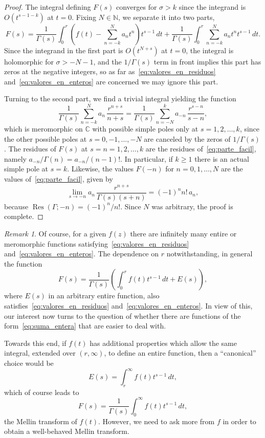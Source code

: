 \documentclass[11pt,a4paper]{amsart}
\newcommand{\N}{\mathbb{N}}
\newcommand{\C}{\mathbb{C}}
\newcommand{\Res}{\operatorname{Res}}
\theoremstyle{plain}
\theoremstyle{plain}
\theoremstyle{plain}
\theoremstyle{definition}
\theoremstyle{remark}
\newtheorem*{remark}{Remark}
\begin{document}
\begin{proof} 
The integral defining $F(s)$ converges for $\sigma > k$ since the integrand is  $O(t^{s-1-k})$ at $t=0$. Fixing $N \in \N$, we separate it into two parts,
\begin{equation*}
  F(s) = \frac{1}{\Gamma(s)} \int_{0}^r \left(f(t)-\sum_{n=-k}^N a_{n} t^{n}\right)t^{s-1}\,dt
 + \frac{1}{\Gamma(s)}\int_{0}^r \sum_{n=-k}^N a_{n} t^{n} t^{s-1}\,dt.
\end{equation*}
Since the integrand in the first part is $O(t^{N+s})$ at $t = 0$, the integral is holomorphic for $\sigma>-N-1$, and the $1/\Gamma(s)$ term in front implies this part has zeros at the negative integers, so as far as~\eqref{eq:valores_en_residuos} and~\eqref{eq:valores_en_enteros} are concerned we may ignore this part.

Turning to the second part, we find a trivial integral yielding the function
\begin{equation}
\label{eq:parte_facil}
  \frac{1}{\Gamma(s)}\sum_{n=-k}^{N} a_{n}\, \frac{r^{n+s}}{n+s}
  = \frac{1}{\Gamma(s)}\sum_{n=-N}^{k} a_{-n}\, \frac{r^{s-n}}{s-n},
\end{equation}
which is meromorphic on $\C$ with possible simple poles only at $s=1,2,\dots,k$, since the other possible poles at $s=0,-1,\dots,-N$ are canceled by the zeros of $1/\Gamma(s)$. The residues of $F(s)$ at $s = n = 1,2,\dots,k$ are the residues of~\eqref{eq:parte_facil}, namely $a_{-n}/\Gamma(n) = a_{-n}/(n-1)!$. In particular, if $k \geq 1$ there is an actual simple pole at $s=k$. Likewise, the values $F(-n)$ for $n=0,1,\dots,N$ are the values of~\eqref{eq:parte_facil}, given by
\[
  \lim_{s\to -n} a_{n} \, \frac{r^{n+s}}{\Gamma(s)(s+n)}=(-1)^{n} n!\,a_{n},
\]
because $\Res(\Gamma;-n) = (-1)^{n}/n!$. Since $N$ was arbitrary, the proof is complete.
\end{proof}


\begin{remark} 
Of course, for a given $f(z)$ there are infinitely many entire or meromorphic functions satisfying~\eqref{eq:valores_en_residuos} and~\eqref{eq:valores_en_enteros}. The dependence on $r$ notwithstanding, in general the function
\begin{equation}
\label{eq:suma_entera}
  F(s) = \frac{1}{\Gamma(s)} \left(\int_{0}^r f(t) t^{s-1}\,dt + E(s)\right),
\end{equation}
where $E(s)$ in an arbitrary entire function, also satisfies~\eqref{eq:valores_en_residuos} and~\eqref{eq:valores_en_enteros}. In view of this, our interest now turns to the question of whether there are functions of the form~\eqref{eq:suma_entera} that are easier to deal with.

Towards this end, if $f(t)$ has additional properties which allow the same integral, extended over $(r,\infty)$, to define an entire function, then a ``canonical'' choice would be
\[
  E(s) =\int_r^{\infty} f(t) t^{s-1}\,dt,
\]
which of course leads to
\[
  F(s) =\frac{1}{\Gamma(s)}\int_{0}^{\infty} f(t) t^{s-1}\,dt,
\]
the Mellin transform of $f(t)$. However, we need to ask more from $f$ in order to obtain a well-behaved Mellin transform.
\end{remark}
\end{document}
